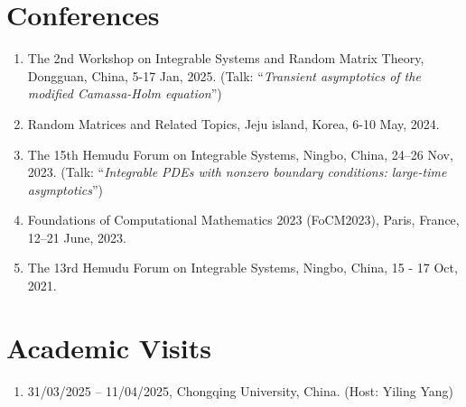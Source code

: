 \documentclass[margin]{res}
\begin{document}
\begin{resume}
\section{Conferences}
\begin{enumerate}[--]
\item The 2nd Workshop on Integrable Systems and Random Matrix Theory, Dongguan, China, 5-17 Jan, 2025. (Talk: ``{\sl Transient asymptotics of the modified Camassa-Holm equation}'')
\item Random Matrices and Related Topics, Jeju island, Korea, 6-10 May, 2024.
\item The 15th Hemudu Forum on Integrable Systems, Ningbo, China, 24--26 Nov, 2023. (Talk: ``{\sl Integrable PDEs with nonzero boundary conditions: large-time asymptotics}'')
\item Foundations of Computational Mathematics 2023 (FoCM2023), Paris, France, 12--21 June, 2023.
\item The 13rd Hemudu Forum on Integrable Systems, Ningbo, China, 15 - 17 Oct, 2021.
\end{enumerate}





\section{Academic Visits}
\begin{enumerate}[--]
\item 31/03/2025 -- 11/04/2025, Chongqing University, China. (Host: Yiling Yang)
\end{enumerate}







\end{resume}
\end{document}
